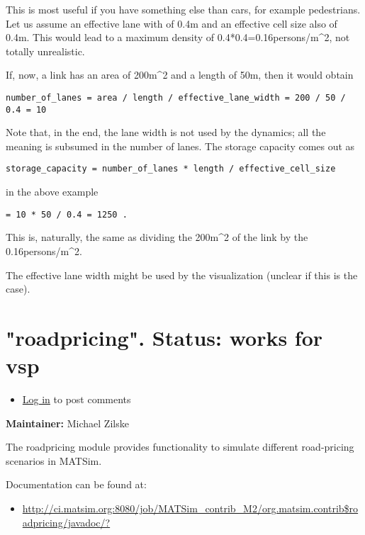 \documentclass[a4paper,11pt]{report}
\begin{document}
This is most useful if you have something else than  cars, for example pedestrians. Let us assume an effective lane  with of 0.4m and an effective cell size also of 0.4m. This would  lead to a maximum density of 0.4*0.4=0.16persons/m\textasciicircum2, not totally  unrealistic.

If, now, a link has an area of 200m\textasciicircum2 and a length of 50m, then it would obtain
\begin{verbatim}
number_of_lanes = area / length / effective_lane_width = 200 / 50 / 0.4 = 10

\end{verbatim}

Note that, in the end, the lane width is not used by the  dynamics; all the meaning is subsumed in the number of lanes. The  storage capacity comes out as
\begin{verbatim}
storage_capacity = number_of_lanes * length / effective_cell_size

\end{verbatim}

in the above example
\begin{verbatim}
= 10 * 50 / 0.4 = 1250 .

\end{verbatim}

This is, naturally, the same as dividing the 200m\textasciicircum2 of the link by the 0.16persons/m\textasciicircum2.

The effective lane width might be used by the visualization (unclear if this is the case).

\vfill\eject
\section{"roadpricing".  Status: works for vsp}
\begin{itemize}
	\item \href{http://www.matsim.org/user/login?destination=comment/reply/383%23comment-form}{Log in} to post comments
\end{itemize}

\textbf{Maintainer:} Michael Zilske

The roadpricing module provides functionality to simulate different road-pricing scenarios in MATSim.

Documentation can be found at:
\begin{itemize}
	\item \href{http://ci.matsim.org:8080/job/MATSim_contrib_M2/org.matsim.contrib$roadpricing/javadoc/?}{http://ci.matsim.org:8080/job/MATSim\_contrib\_M2/org.matsim.contrib\$roadpricing/javadoc/?}
\end{itemize}
\end{document}
